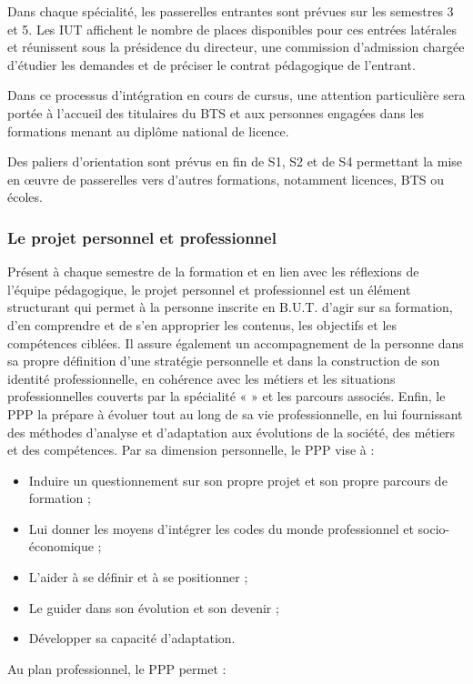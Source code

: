 \documentclass[10pt]{article}
\begin{document}
Dans chaque spécialité, les passerelles entrantes sont prévues sur les
semestres 3 et 5. Les IUT affichent le nombre de places disponibles pour
ces entrées latérales et réunissent sous la présidence du directeur, une
commission d’admission chargée d’étudier les demandes et de préciser le
contrat pédagogique de l’entrant.

Dans ce processus d’intégration en cours de cursus, une attention
particulière sera portée à l’accueil des titulaires du BTS et aux
personnes engagées dans les formations menant au diplôme national de
licence.

Des paliers d’orientation sont prévus en fin de S1, S2 et de S4
permettant la mise en œuvre de passerelles vers d’autres formations,
notamment licences, BTS ou écoles.

\subsubsection{Le projet personnel et professionnel}
Présent à chaque semestre de la formation et en lien avec les réflexions
de l'équipe pédagogique, le projet personnel et professionnel est un
élément structurant qui permet à la personne inscrite en B.U.T. d'agir
sur sa formation, d'en comprendre et de s'en approprier les contenus,
les objectifs et les compétences ciblées. Il assure également un
accompagnement de la personne dans sa propre définition d'une stratégie
personnelle et dans la construction de son identité professionnelle, en
cohérence avec les métiers et les situations professionnelles couverts
par la spécialité «  » et les parcours
associés. Enfin, le PPP la prépare à évoluer tout au long de sa vie
professionnelle, en lui fournissant des méthodes d'analyse et
d'adaptation aux évolutions de la société, des métiers et des
compétences.  Par sa dimension personnelle, le PPP vise à :
\begin{itemize}
\item Induire un questionnement sur son propre projet et son propre
  parcours de formation ;
\item Lui donner les moyens d'intégrer les codes du
  monde professionnel et socio-économique ;
\item L'aider à se définir et à se positionner ;
\item Le guider dans son évolution et son devenir ;
\item Développer sa capacité d'adaptation.
\end{itemize}
Au plan professionnel, le PPP permet :
\end{document}
